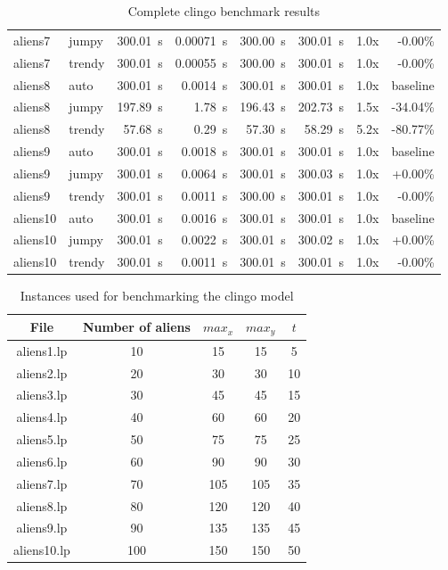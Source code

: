 \documentclass[11pt]{article}
\begin{document}
\begin{table}[h]
\begin{tabular}{|llrrrrrr|}
    aliens7 & jumpy & 300.01~s & 0.00071~s & 300.00~s & 300.01~s & 1.0x & -0.00\% \\
    aliens7 & trendy & 300.01~s & 0.00055~s & 300.00~s & 300.01~s & 1.0x & -0.00\% \\
    \hline
    aliens8 & auto & 300.01~s & 0.0014~s & 300.01~s & 300.01~s & 1.0x & baseline \\
    aliens8 & jumpy & 197.89~s & 1.78~s & 196.43~s & 202.73~s & 1.5x & -34.04\% \\
    aliens8 & trendy & 57.68~s & 0.29~s & 57.30~s & 58.29~s & 5.2x & -80.77\% \\
    \hline
    aliens9 & auto & 300.01~s & 0.0018~s & 300.01~s & 300.01~s & 1.0x & baseline \\
    aliens9 & jumpy & 300.01~s & 0.0064~s & 300.01~s & 300.03~s & 1.0x & +0.00\% \\
    aliens9 & trendy & 300.01~s & 0.0011~s & 300.00~s & 300.01~s & 1.0x & -0.00\% \\
    \hline
    aliens10 & auto & 300.01~s & 0.0016~s & 300.01~s & 300.01~s & 1.0x & baseline \\
    aliens10 & jumpy & 300.01~s & 0.0022~s & 300.01~s & 300.02~s & 1.0x & +0.00\% \\
    aliens10 & trendy & 300.01~s & 0.0011~s & 300.01~s & 300.01~s & 1.0x & -0.00\% \\
    \hline
  \end{tabular}
  \caption{Complete clingo benchmark results}
  \label{table:clingo-bench-comparative}
\end{table}

\begin{table}[h]
  \centering
  \begin{tabular}{|c|c|c|c|c|}
    \hline
    File & Number of aliens & $max_x$ & $max_y$ & $t$ \\
    \hline
    aliens1.lp & 10 & 15 & 15 & 5 \\
    aliens2.lp & 20 & 30 & 30 & 10 \\
    aliens3.lp & 30 & 45 & 45 & 15 \\
    aliens4.lp & 40 & 60 & 60 & 20 \\
    aliens5.lp & 50 & 75 & 75 & 25 \\
    aliens6.lp & 60 & 90 & 90 & 30 \\
    aliens7.lp & 70 & 105 & 105 & 35 \\
    aliens8.lp & 80 & 120 & 120 & 40 \\
    aliens9.lp & 90 & 135 & 135 & 45 \\
    aliens10.lp & 100 & 150 & 150 & 50 \\
    \hline
  \end{tabular}
  \caption{Instances used for benchmarking the clingo model}
  \label{table:clingo-bench-instances}
\end{table}
\end{document}
